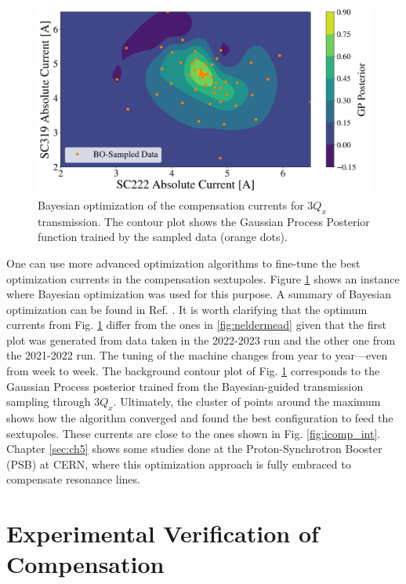\begin{figure}[H]
    \centering
    \includegraphics[width=\columnwidth]{chapter4/bo.png}
    \caption{Bayesian optimization of the compensation currents for $3Q_x$ transmission. The contour plot shows the Gaussian Process Posterior function trained by the sampled data (orange dots).}
    \label{fig:boRR}
\end{figure}

One can use more advanced optimization algorithms to fine-tune the best optimization currents in the compensation sextupoles. Figure \ref{fig:boRR} shows an instance where Bayesian optimization was used for this purpose. A summary of Bayesian optimization can be found in Ref. \cite{bayesian}. It is worth clarifying that the optimum currents from Fig. \ref{fig:boRR} differ from the ones in \ref{fig:neldermead} given that the first plot was generated from data taken in the 2022-2023 run and the other one from the 2021-2022 run. The tuning of the machine changes from year to year---even from week to week. The background contour plot of Fig. \ref{fig:boRR} corresponds to the Gaussian Process posterior trained from the Bayesian-guided transmission sampling through $3Q_x$. Ultimately, the cluster of points around the maximum shows how the algorithm converged and found the best configuration to feed the sextupoles. These currents are close to the ones shown in Fig. \ref{fig:icomp_int}. Chapter \ref{sec:ch5} shows some studies done at the Proton-Synchrotron Booster (PSB) at CERN, where this optimization approach is fully embraced to compensate resonance lines.

\section{\label{sec:verify}Experimental Verification of Compensation}

